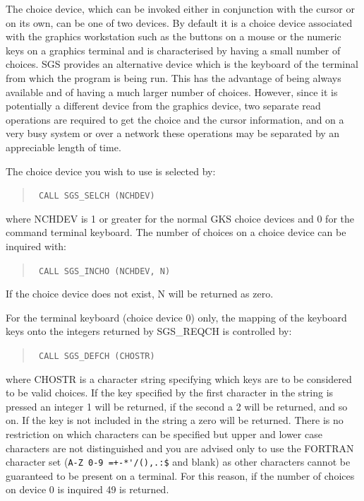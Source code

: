 \documentclass[11pt]{article}
\newcommand{\htmlref}[2]{#1}
\begin{document}
The choice device, which can be invoked either in conjunction with the cursor
or on its own, can be one of two devices.  By
default it is a choice device
associated with the graphics workstation such as the  buttons on
a mouse or the numeric keys on a graphics terminal and is characterised by
having a small number of choices.  SGS provides an
alternative device which is the keyboard of the terminal from which the
program is being run.  This
has the advantage of being always available
and of having a much larger number of
choices.  However, since
it is potentially a different device from the graphics device, two separate
read operations are required to get the choice and the cursor
information,
and
on a very busy system or over a network these operations may be separated by
an appreciable length of time.

The choice device you wish to use is selected by:
\begin{quote}{\tt
    CALL \htmlref{SGS\_SELCH}{SGS_SELCH} (NCHDEV)}
\end{quote}
where NCHDEV is 1 or greater for the normal GKS choice devices and 0 for the
command terminal keyboard.
The number of choices on a choice device can be inquired with:
\begin{quote}{\tt
    CALL \htmlref{SGS\_INCHO}{SGS_INCHO} (NCHDEV, N)}
\end{quote}
If the choice device does not exist, N will be returned as zero.

For the terminal keyboard (choice device
0) only, the mapping of the keyboard keys onto the integers returned by
SGS\_REQCH is controlled by:
\begin{quote}{\tt
    CALL \htmlref{SGS\_DEFCH}{SGS_DEFCH} (CHOSTR)}
\end{quote}
where CHOSTR is a character string specifying which keys are to be considered
to be valid choices.  If the key specified by the first character in
the string is pressed an
integer 1 will be
returned, if the second a 2 will be returned,
and so on.  If the key is not included in the string
a zero will be returned.  There is no restriction on which characters can be
specified but upper and lower case characters are not distinguished and you
are advised only to use the FORTRAN character set (\verb#A-Z 0-9 =+-*'/(),.:$#
and blank) as other characters cannot be guaranteed to be present on a
terminal.  For this reason, if
the number of choices on device 0 is inquired 49 is
returned.
\end{document}
